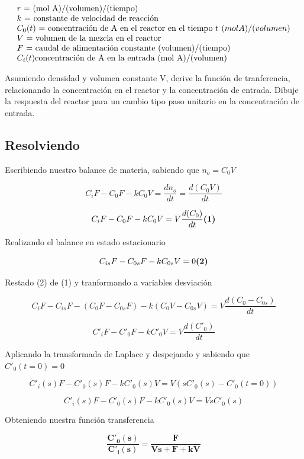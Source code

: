 \documentclass[
  letterpaper,
  DIV=11,
  numbers=noendperiod]{scrreprt}
\begin{document}
\[
\begin{array}{l}
r \text{ = (mol A)/(volumen)/(tiempo)}\\
k \text{ = constante de velocidad de reacción}\\
C_0(t)\text{ = concentración de A en el reactor en el tiempo t } (mol\space A)/(volumen)\\
V\text{ = volumen de la mezcla en el reactor}\\
F\text{ = caudal de alimentación constante (volumen)/(tiempo)}\\
C_i(t)\text{concentración de A en la entrada (mol A)/(volumen)}
\end{array}
\]

Asumiendo densidad y volumen constante V, derive la función de
tranferencia, relacionando la concentración en el reactor y la
concentración de entrada. Dibuje la respuesta del reactor para un cambio
tipo paso unitario en la concentración de entrada.

\hypertarget{resolviendo-1}{%
\subsection{Resolviendo}\label{resolviendo-1}}

Escribiendo nuestro balance de materia, sabiendo que \(n_o = C_0V\)

\[
C_iF-C_0F-kC_0V=\frac{dn_o}{dt} = \frac{d(C_0V)}{dt}
\]

\[
C_iF-C_0F-kC_0V=V \frac{d(C_0)}{dt} \space\space\space\space\space\textbf{(1)}
\]

Realizando el balance en estado estacionario

\[
C_{is}F-C_{0s}F-kC_{0s}V=0 \space\space\space\space\space\textbf{(2)}
\]

Restado (2) de (1) y tranformando a variables desviación

\[
C_iF-C_{is}F-(C_0F-C_{0s}F)-k(C_0V-C_{0s}V)=V \frac{d(C_0-C_{0s})}{dt}
\]

\[
C'_iF-C'_0F-kC'_0V=V \frac{d(C'_0)}{dt} 
\]

Aplicando la transformada de Laplace y despejando y sabiendo que
\(C'_0(t=0) = 0\)

\[
C'_i(s)F-C'_0(s)F-kC'_0(s)V=V (sC'_0(s)-C'_0(t=0))
\]

\[
C'_i(s)F-C'_0(s)F-kC'_0(s)V=V sC'_0(s)
\]

Obteniendo nuestra función transferencia

\[
\mathbf{\frac{C'_0(s)}{C'_i(s)}=\frac{F}{Vs+F+kV}}
\]
\end{document}
